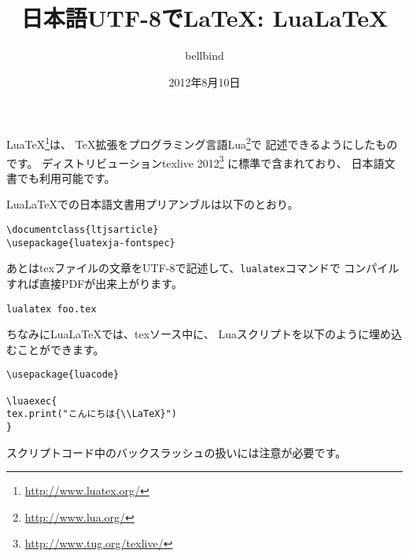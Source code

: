 \documentclass{ltjsarticle}
\title{日本語UTF-8で\LaTeX : Lua\LaTeX}
\author{bellbind}
\date{2012年8月10日}
\begin{document}
\maketitle

{Lua\TeX}\footnote{\url{http://www.luatex.org/}}は、
{\TeX}拡張をプログラミング言語Lua\footnote{\url{http://www.lua.org/}}で
記述できるようにしたものです。
ディストリビューションtexlive 2012\footnote{\url{http://www.tug.org/texlive/}}
に標準で含まれており、
日本語文書でも利用可能です。

{Lua\LaTeX}での日本語文書用プリアンブルは以下のとおり。

\begin{lstlisting}[frame=single]
\documentclass{ltjsarticle}
\usepackage{luatexja-fontspec}
\end{lstlisting}

あとはtexファイルの文章をUTF-8で記述して、{\tt lualatex}コマンドで
コンパイルすれば直接PDFが出来上がります。

\begin{lstlisting}[frame=shadowbox]
lualatex foo.tex
\end{lstlisting}

ちなみにLua{\LaTeX}では、texソース中に、
Luaスクリプトを以下のように埋め込むことができます。

\begin{lstlisting}[frame=single]
\usepackage{luacode}

\luaexec{
tex.print("こんにちは{\\LaTeX}")
}
\end{lstlisting}

スクリプトコード中のバックスラッシュの扱いには注意が必要です。
\end{document}
